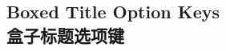 \setcounter{section}{10}
\setcounter{subsection}{1}
\setcounter{subsubsection}{0}

\subsection{Boxed Title Option Keys\\盒子标题选项键}\label{subsec:skinboxedtitle}


